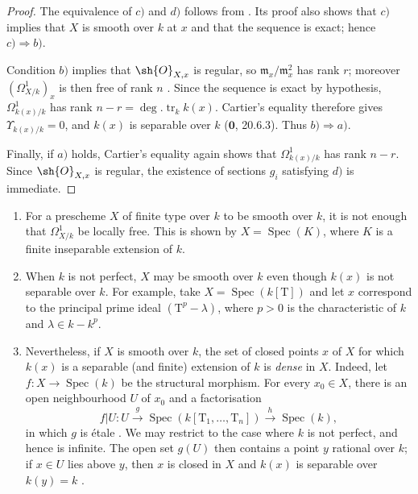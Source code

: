 \begin{proof}
The equivalence of $c)$ and $d)$ follows from .  Its proof also shows that $c)$ implies that $X$ is smooth over $k$ at $x$ and that the sequence  is exact; hence $c)\Rightarrow b)$.

Condition $b)$ implies that $\sh{O}_{X,x}$ is regular, so $\mathfrak m_x/\mathfrak m_x^2$ has rank $r$; moreover $(\Omega^1_{X/k})_x$ is then free of rank $n$ .  Since the sequence  is exact by hypothesis, $\Omega^1_{k(x)/k}$ has rank $n-r=\deg.\operatorname{tr}_k k(x)$.  Cartier's equality therefore gives $\Upsilon_{k(x)/k}=0$, and $k(x)$ is separable over $k$ ($\mathbf{0}$, 20.6.3).  Thus $b)\Rightarrow a)$.

Finally, if $a)$ holds, Cartier's equality again shows that $\Omega^1_{k(x)/k}$ has rank $n-r$.  Since $\sh{O}_{X,x}$ is regular, the existence of sections $g_i$ satisfying $d)$ is immediate.
\end{proof}

\begin{remarks}[17.15.10]
\label{IV.17.15.10}
\begin{enumerate}[label=(\roman*)]
  \item For a prescheme $X$ of finite type over $k$ to be smooth over $k$, it is not enough that $\Omega^1_{X/k}$ be locally free.  This is shown by $X=\operatorname{Spec}(K)$, where $K$ is a finite inseparable extension of $k$.
  \item When $k$ is not perfect, $X$ may be smooth over $k$ even though $k(x)$ is not separable over $k$.  For example, take $X=\operatorname{Spec}(k[\mathrm{T}])$ and let $x$ correspond to the principal prime ideal $(\mathrm{T}^p-\lambda)$, where $p>0$ is the characteristic of $k$ and $\lambda\in k-k^p$.
  \item Nevertheless, if $X$ is smooth over $k$, the set of closed points $x$ of $X$ for which $k(x)$ is a separable (and finite) extension of $k$ is \emph{dense} in $X$.  Indeed, let $f:X\to\operatorname{Spec}(k)$ be the structural morphism.  For every $x_0\in X$, there is an open neighbourhood $U$ of $x_0$ and a factorisation
  \[
   f|U:U\xrightarrow{g}\operatorname{Spec}(k[\mathrm{T}_1,\ldots,\mathrm{T}_n])\xrightarrow{h}\operatorname{Spec}(k),
  \]
  in which $g$ is \'etale .  We may restrict to the case where $k$ is not perfect, and hence is infinite.  The open set $g(U)$ then contains a point $y$ rational over $k$; if $x\in U$ lies above $y$, then $x$ is closed in $X$ and $k(x)$ is separable over $k(y)=k$ .
\end{enumerate}
\end{remarks}

